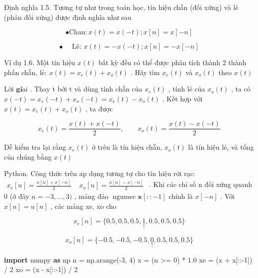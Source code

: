\documentclass[
  10
]{article}
\newenvironment{Shaded}{}{}
\newcommand{\DecValTok}[1]{\textcolor[rgb]{0.25,0.63,0.44}{#1}}
\newcommand{\FloatTok}[1]{\textcolor[rgb]{0.25,0.63,0.44}{#1}}
\newcommand{\ImportTok}[1]{\textcolor[rgb]{0.00,0.50,0.00}{\textbf{#1}}}
\newcommand{\NormalTok}[1]{#1}
\newcommand{\OperatorTok}[1]{\textcolor[rgb]{0.40,0.40,0.40}{#1}}
\begin{document}
Định nghĩa 1.5. Tương tự như trong toán học, tín hiệu chẵn (đối xứng) và
lẻ (phản đối xứng) được định nghĩa như sau

\[
\bullet \mathrm{Chan:} x (t) = x (- t); x [ n ] = x [ - n ]
\]

\[
\bullet \quad \text {   Lê:   } x (t) = - x (- t); x [ n ] = - x [ - n ]
\]

Ví dụ 1.6. Một tín hiệu \(x ( t )\) bất kỳ đều có thể được phân tích
thành 2 thành phần chẵn, lẻ:
\(x ( t ) = x _ { e } ( t ) + x _ { o } ( t )\) . Hãy tìm
\(x _ { e } ( t )\) và \(x _ { o } ( t )\) theo \(x ( t )\)

Lời \(\mathbf { g i } \mathrm { \dot { a } i }\) . Thay t bởi t và dùng
tính chẵn của \(x _ { e } ( t )\) , tính lẻ của \(x _ { o } ( t )\) , ta
có
\(x ( - t ) = x _ { e } ( - t ) + x _ { o } ( - t ) = x _ { e } ( t ) - x _ { o } ( t )\)
. Kết hợp với \(x ( t ) = x _ { e } ( t ) + x _ { o } ( t )\) , ta được

\[
x _ {e} (t) = \frac {x (t) + x (- t)}{2}, \qquad x _ {o} (t) = \frac {x (t) - x (- t)}{2}
\]

Dễ kiểm tra lại rằng \(x _ { e } ( t )\) ở trên là tín hiệu chẵn,
\(x _ { o } ( t )\) là tín hiệu lẻ, và tổng của chúng bằng \(x ( t )\) 

Python. Công thức trên \(\mathrm { { \acute { a p } } }\) dụng tương tự
cho tín hiệu rời rạc:
\(\begin{array} { r } { x _ { e } [ n ] = \frac { x [ n ] + x [ - n ] } { 2 } } \end{array}\)
\(\begin{array} { r } { x _ { o } [ n ] = \frac { x [ n ] - x [ - n ] } { 2 } } \end{array}\)
. Khi các chỉ số n đối xứng quanh 0 (ở đây \(n = - 3 , \ldots , 3 )\) ,
mảng đảo
\(\operatorname { n g u m e c } \mathbf { x } \left[ : : - 1 \right]\)
chính là \(x [ - n ]\) . Với \(x [ n ] = u [ n ]\) , các mảng xe, xo cho

\[
x _ {e} [ n ] = \{0. 5, 0. 5, 0. 5, \underset {\uparrow} {1}, 0. 5, 0. 5, 0. 5 \}
\]

\[
x _ {o} [ n ] = \{- 0. 5, - 0. 5, - 0. 5, \underset {\uparrow} {0}, 0. 5, 0. 5, 0. 5 \}
\]

\begin{Shaded}
\begin{Highlighting}[]
\ImportTok{import}\NormalTok{ numpy }\ImportTok{as}\NormalTok{ np}
\NormalTok{n }\OperatorTok{=}\NormalTok{ np.arange(}\OperatorTok{{-}}\DecValTok{3}\NormalTok{, }\DecValTok{4}\NormalTok{)}
\NormalTok{x }\OperatorTok{=}\NormalTok{ (n }\OperatorTok{\textgreater{}=} \DecValTok{0}\NormalTok{) }\OperatorTok{*} \FloatTok{1.0}
\NormalTok{xe }\OperatorTok{=}\NormalTok{ (x }\OperatorTok{+}\NormalTok{ x[::}\OperatorTok{{-}}\DecValTok{1}\NormalTok{]) }\OperatorTok{/} \DecValTok{2}
\NormalTok{xo }\OperatorTok{=}\NormalTok{ (x }\OperatorTok{{-}}\NormalTok{ x[::}\OperatorTok{{-}}\DecValTok{1}\NormalTok{]) }\OperatorTok{/} \DecValTok{2} 
\end{Highlighting}
\end{Shaded}
\end{document}
